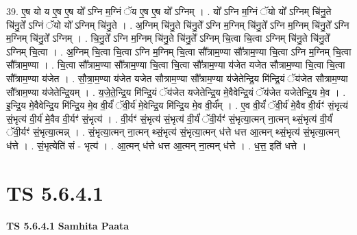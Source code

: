 \documentclass[17pt]{extarticle}
\begin{document}
39. ए॒ष यो य ए॒ष ए॒ष यो᳚ ऽग्नि म॒ग्निं ॅय ए॒ष ए॒ष यो᳚ ऽग्निम् । . यो᳚ ऽग्नि म॒ग्निं ॅयो यो᳚ ऽग्निम् चि॑नु॒ते चि॑नु॒ते᳚ ऽग्निं ॅयो यो᳚ ऽग्निम् चि॑नु॒ते । . अ॒ग्निम् चि॑नु॒ते चि॑नु॒ते᳚ ऽग्नि म॒ग्निम् चि॑नु॒ते᳚ ऽग्नि म॒ग्निम् चि॑नु॒ते᳚ ऽग्नि म॒ग्निम् चि॑नु॒ते᳚ ऽग्निम् । . चि॒नु॒ते᳚ ऽग्नि म॒ग्निम् चि॑नु॒ते चि॑नु॒ते᳚ ऽग्निम् चि॒त्वा चि॒त्वा ऽग्निम् चि॑नु॒ते चि॑नु॒ते᳚ ऽग्निम् चि॒त्वा । . अ॒ग्निम् चि॒त्वा चि॒त्वा ऽग्नि म॒ग्निम् चि॒त्वा सौ᳚त्राम॒ण्या सौ᳚त्राम॒ण्या चि॒त्वा ऽग्नि म॒ग्निम् चि॒त्वा सौ᳚त्राम॒ण्या । . चि॒त्वा सौ᳚त्राम॒ण्या सौ᳚त्राम॒ण्या चि॒त्वा चि॒त्वा सौ᳚त्राम॒ण्या य॑जेत यजेत सौत्राम॒ण्या चि॒त्वा चि॒त्वा सौ᳚त्राम॒ण्या य॑जेत । . सौ॒त्रा॒म॒ण्या य॑जेत यजेत सौत्राम॒ण्या सौ᳚त्राम॒ण्या य॑जेतेन्द्रि॒य मि॑न्द्रि॒यं ॅय॑जेत सौत्राम॒ण्या सौ᳚त्राम॒ण्या य॑जेतेन्द्रि॒यम् । . य॒जे॒ते॒न्द्रि॒य मि॑न्द्रि॒यं ॅय॑जेत यजेतेन्द्रि॒य मे॒वैवेन्द्रि॒यं ॅय॑जेत यजेतेन्द्रि॒य मे॒व । . इ॒न्द्रि॒य मे॒वैवेन्द्रि॒य मि॑न्द्रि॒य मे॒व वी॒र्यं॑ ॅवी॒र्य॑ मे॒वेन्द्रि॒य मि॑न्द्रि॒य मे॒व वी॒र्य᳚म् । . ए॒व वी॒र्यं॑ ॅवी॒र्य॑ मे॒वैव वी॒र्यꣳ॑ सं॒भृत्य॑ सं॒भृत्य॑ वी॒र्य॑ मे॒वैव वी॒र्यꣳ॑ सं॒भृत्य॑ । . वी॒र्यꣳ॑ सं॒भृत्य॑ सं॒भृत्य॑ वी॒र्यं॑ ॅवी॒र्यꣳ॑ सं॒भृत्या॒त्मन् ना॒त्मन् थ्सं॒भृत्य॑ वी॒र्यं॑ ॅवी॒र्यꣳ॑ सं॒भृत्या॒त्मन्न् । . सं॒भृत्या॒त्मन् ना॒त्मन् थ्सं॒भृत्य॑ सं॒भृत्या॒त्मन् ध॑त्ते धत्त आ॒त्मन् थ्सं॒भृत्य॑ सं॒भृत्या॒त्मन् ध॑त्ते । . सं॒भृत्येति॑ सं - भृत्य॑ । . आ॒त्मन् ध॑त्ते धत्त आ॒त्मन् ना॒त्मन् ध॑त्ते । . ध॒त्त॒ इति॑ धत्ते । \newline
\pagebreak
{}

\section{ TS 5.6.4.1 }

\textbf{TS 5.6.4.1 } \newline
\textbf{Samhita Paata} \newline
\end{document}
